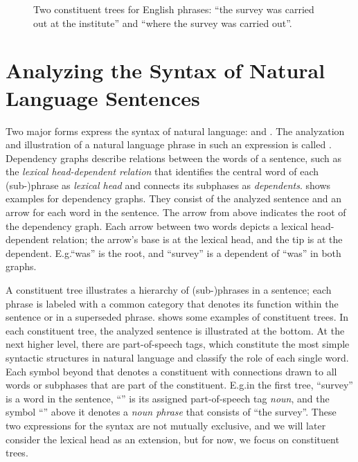 \documentclass[../document.tex]{subfiles}
\begin{document}
    \begin{figure}
        \null\hfill
        
        \hfill
        
        \hfill\null
        \caption{\label{fig:constituent}
            Two constituent trees for English phrases: ``the survey was carried out at the institute'' and ``where the survey was carried out''.
        }
    \end{figure}
    
    \section*{Analyzing the Syntax of Natural Language Sentences}
    Two major forms express the syntax of natural language:  and .
    The analyzation and illustration of a natural language phrase in such an expression is called .
    Dependency graphs describe relations between the words of a sentence, such as the \emph{lexical head-dependent relation} that identifies the central word of each (sub-)phrase as \emph{lexical head} and connects its subphases as \emph{dependents}. \citep[Section 18.1]{Jur23}
     shows examples for dependency graphs.
    They consist of the analyzed sentence and an arrow for each word in the sentence.
    The arrow from above indicates the root of the dependency graph.
    Each arrow between two words depicts a lexical head-dependent relation; the arrow's base is at the lexical head, and the tip is at the dependent.
    E.g.\@ ``was'' is the root, and ``survey'' is a dependent of ``was'' in both graphs. 
            
    A constituent tree illustrates a hierarchy of (sub-)phrases in a sentence; each phrase is labeled with a common category that denotes its function within the sentence or in a superseded phrase.
     shows some examples of constituent trees.
    In each constituent tree, the analyzed sentence is illustrated at the bottom.
    At the next higher level, there are part-of-speech tags, which constitute the most simple syntactic structures in natural language and classify the role of each single word.
    Each symbol beyond that denotes a constituent with connections drawn to all words or subphases that are part of the constituent.
    E.g.\@ in the first tree, ``survey'' is a word in the sentence, ``'' is its assigned part-of-speech tag \emph{noun}, and the symbol ``'' above it denotes a \emph{noun phrase} that consists of ``the survey''.
    These two expressions for the syntax are not mutually exclusive, and we will later consider the lexical head as an extension, but for now, we focus on constituent trees.
    
\end{document}
